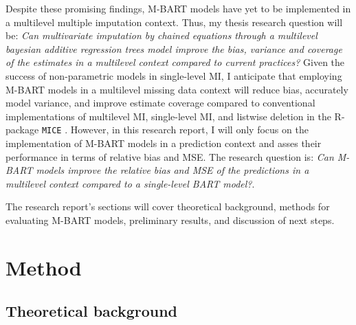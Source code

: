 \documentclass[10pt, a4paper, titlepage]{article}
\begin{document}
Despite these promising findings, M-BART models have yet to be implemented in a multilevel multiple imputation context. Thus, my thesis research question will be: \textit{Can multivariate imputation by chained equations through a multilevel bayesian additive regression trees model improve the bias, variance and coverage of the estimates in a multilevel context compared to current practices?} Given the success of non-parametric models in single-level MI, I anticipate that employing M-BART models in a multilevel missing data context will reduce bias, accurately model variance, and improve estimate coverage compared to conventional implementations of multilevel MI, single-level MI, and listwise deletion in the R-package \texttt{MICE} \citep{buuren2011}. However, in this research report, I will only focus on the implementation of M-BART models in a prediction context and asses their performance in terms of relative bias and MSE. The research question is: \textit{Can M-BART models improve the relative bias and MSE of the predictions in a multilevel context compared to a single-level BART model?}.

The research report's sections will cover theoretical background, methods for evaluating M-BART models, preliminary results, and discussion of next steps.

\section{Method}
\subsection{Theoretical background}
\end{document}
